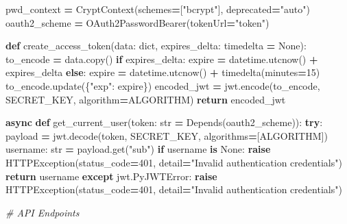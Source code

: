 \documentclass[
]{article}
\newenvironment{Shaded}{\begin{snugshade}}{\end{snugshade}}
\newcommand{\BuiltInTok}[1]{#1}
\newcommand{\CommentTok}[1]{\textcolor[rgb]{0.56,0.35,0.01}{\textit{#1}}}
\newcommand{\ControlFlowTok}[1]{\textcolor[rgb]{0.13,0.29,0.53}{\textbf{#1}}}
\newcommand{\DecValTok}[1]{\textcolor[rgb]{0.00,0.00,0.81}{#1}}
\newcommand{\KeywordTok}[1]{\textcolor[rgb]{0.13,0.29,0.53}{\textbf{#1}}}
\newcommand{\NormalTok}[1]{#1}
\newcommand{\OperatorTok}[1]{\textcolor[rgb]{0.81,0.36,0.00}{\textbf{#1}}}
\newcommand{\StringTok}[1]{\textcolor[rgb]{0.31,0.60,0.02}{#1}}
\newcommand{\VariableTok}[1]{\textcolor[rgb]{0.00,0.00,0.00}{#1}}
\begin{document}
\begin{Shaded}
\begin{Highlighting}[]
\NormalTok{pwd\_context }\OperatorTok{=}\NormalTok{ CryptContext(schemes}\OperatorTok{=}\NormalTok{[}\StringTok{"bcrypt"}\NormalTok{], deprecated}\OperatorTok{=}\StringTok{"auto"}\NormalTok{)}
\NormalTok{oauth2\_scheme }\OperatorTok{=}\NormalTok{ OAuth2PasswordBearer(tokenUrl}\OperatorTok{=}\StringTok{"token"}\NormalTok{)}

\KeywordTok{def}\NormalTok{ create\_access\_token(data: }\BuiltInTok{dict}\NormalTok{, expires\_delta: timedelta }\OperatorTok{=} \VariableTok{None}\NormalTok{):}
\NormalTok{    to\_encode }\OperatorTok{=}\NormalTok{ data.copy()}
    \ControlFlowTok{if}\NormalTok{ expires\_delta:}
\NormalTok{        expire }\OperatorTok{=}\NormalTok{ datetime.utcnow() }\OperatorTok{+}\NormalTok{ expires\_delta}
    \ControlFlowTok{else}\NormalTok{:}
\NormalTok{        expire }\OperatorTok{=}\NormalTok{ datetime.utcnow() }\OperatorTok{+}\NormalTok{ timedelta(minutes}\OperatorTok{=}\DecValTok{15}\NormalTok{)}
\NormalTok{    to\_encode.update(\{}\StringTok{"exp"}\NormalTok{: expire\})}
\NormalTok{    encoded\_jwt }\OperatorTok{=}\NormalTok{ jwt.encode(to\_encode, SECRET\_KEY, algorithm}\OperatorTok{=}\NormalTok{ALGORITHM)}
    \ControlFlowTok{return}\NormalTok{ encoded\_jwt}

\ControlFlowTok{async} \KeywordTok{def}\NormalTok{ get\_current\_user(token: }\BuiltInTok{str} \OperatorTok{=}\NormalTok{ Depends(oauth2\_scheme)):}
    \ControlFlowTok{try}\NormalTok{:}
\NormalTok{        payload }\OperatorTok{=}\NormalTok{ jwt.decode(token, SECRET\_KEY, algorithms}\OperatorTok{=}\NormalTok{[ALGORITHM])}
\NormalTok{        username: }\BuiltInTok{str} \OperatorTok{=}\NormalTok{ payload.get(}\StringTok{"sub"}\NormalTok{)}
        \ControlFlowTok{if}\NormalTok{ username }\KeywordTok{is} \VariableTok{None}\NormalTok{:}
            \ControlFlowTok{raise}\NormalTok{ HTTPException(status\_code}\OperatorTok{=}\DecValTok{401}\NormalTok{, detail}\OperatorTok{=}\StringTok{"Invalid authentication credentials"}\NormalTok{)}
        \ControlFlowTok{return}\NormalTok{ username}
    \ControlFlowTok{except}\NormalTok{ jwt.PyJWTError:}
        \ControlFlowTok{raise}\NormalTok{ HTTPException(status\_code}\OperatorTok{=}\DecValTok{401}\NormalTok{, detail}\OperatorTok{=}\StringTok{"Invalid authentication credentials"}\NormalTok{)}

\CommentTok{\# API Endpoints}


\end{Highlighting}
\end{Shaded}
\end{document}
